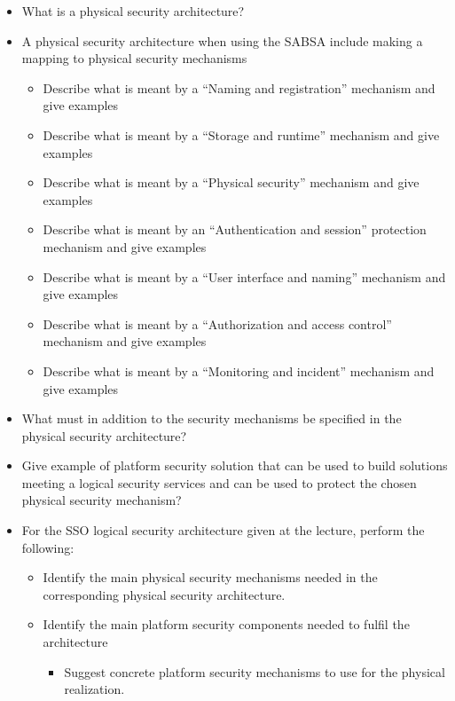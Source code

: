 \begin{itemize}
\item What is a physical security architecture?
\item A physical security architecture when using the SABSA include making a mapping to physical security mechanisms
  \begin{itemize}[noitemsep]
  \item Describe what is meant by a ``Naming and registration'' mechanism and give examples
  \item Describe what is meant by a ``Storage and runtime'' mechanism and give examples
  \item Describe what is meant by a ``Physical security'' mechanism and give examples
  \item Describe what is meant by an ``Authentication and session'' protection mechanism and give examples
  \item Describe what is meant by a ``User interface and naming'' mechanism and give examples
  \item Describe what is meant by a ``Authorization and access control'' mechanism and give examples
  \item Describe what is meant by a ``Monitoring and incident'' mechanism and give examples
  \end{itemize}

\item What must in addition to the security mechanisms be specified in the physical security architecture?
\item Give example of platform security solution that can be used to build solutions meeting a logical security services and can be used to protect the chosen physical security mechanism?
\item For the SSO logical security architecture given at the lecture, perform the following:
  \begin{itemize}[noitemsep]
  \item Identify the main physical security mechanisms needed in the corresponding physical security architecture.
  \item Identify the main platform security components needed to fulfil the architecture
    \begin{itemize}[noitemsep]
    \item Suggest concrete platform security mechanisms to use for the physical realization.
    \end{itemize}
  \end{itemize}
\end{itemize}

